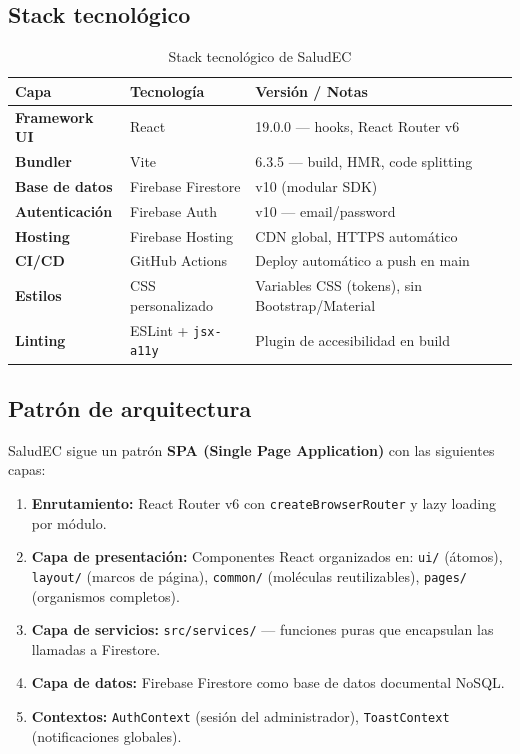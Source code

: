 \documentclass[12pt, a4paper]{article}
\begin{document}
\subsection{Stack tecnológico}

\begin{table}[H]
\centering
\caption{Stack tecnológico de SaludEC}
\begin{tabular}{@{}>{\bfseries}p{3.5cm} p{4.5cm} p{5.5cm}@{}}
\toprule
\rowcolor{royalblue!12}
\textbf{Capa} & \textbf{Tecnología} & \textbf{Versión / Notas} \\
\midrule
Framework UI & React & 19.0.0 — hooks, React Router v6 \\
Bundler & Vite & 6.3.5 — build, HMR, code splitting \\
Base de datos & Firebase Firestore & v10 (modular SDK) \\
Autenticación & Firebase Auth & v10 — email/password \\
Hosting & Firebase Hosting & CDN global, HTTPS automático \\
CI/CD & GitHub Actions & Deploy automático a push en main \\
Estilos & CSS personalizado & Variables CSS (tokens), sin Bootstrap/Material \\
Linting & ESLint + \texttt{jsx-a11y} & Plugin de accesibilidad en build \\
\bottomrule
\end{tabular}
\end{table}

\subsection{Patrón de arquitectura}

SaludEC sigue un patrón \textbf{SPA (Single Page Application)} con las siguientes capas:

\begin{enumerate}
  \item \textbf{Enrutamiento:} React Router v6 con \texttt{createBrowserRouter} y lazy loading por módulo.
  \item \textbf{Capa de presentación:} Componentes React organizados en: \texttt{ui/} (átomos), \texttt{layout/} (marcos de página), \texttt{common/} (moléculas reutilizables), \texttt{pages/} (organismos completos).
  \item \textbf{Capa de servicios:} \texttt{src/services/} — funciones puras que encapsulan las llamadas a Firestore.
  \item \textbf{Capa de datos:} Firebase Firestore como base de datos documental NoSQL.
  \item \textbf{Contextos:} \texttt{AuthContext} (sesión del administrador), \texttt{ToastContext} (notificaciones globales).
\end{enumerate}
\end{document}
